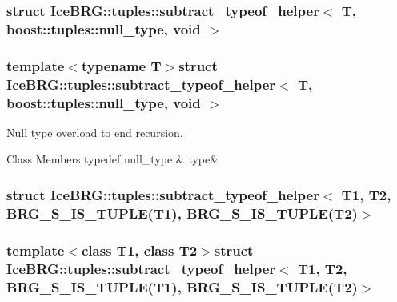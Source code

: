 \subsubsection{struct Ice\+B\+R\+G\+:\+:tuples\+:\+:subtract\+\_\+typeof\+\_\+helper$<$ T, boost\+:\+:tuples\+:\+:null\+\_\+type, void $>$}
\subsubsection*{template$<$typename T$>$struct Ice\+B\+R\+G\+::tuples\+::subtract\+\_\+typeof\+\_\+helper$<$ T, boost\+::tuples\+::null\+\_\+type, void $>$}

Null type overload to end recursion. \begin{DoxyFields}{Class Members}
\hypertarget{namespaceIceBRG_1_1tuples_a3ac5f6d7ed167ef5757b624c09149f96}{}typedef null\+\_\+type\label{namespaceIceBRG_1_1tuples_a3ac5f6d7ed167ef5757b624c09149f96}
&
type&
\\
\hline

\end{DoxyFields}
\label{structIceBRG_1_1tuples_1_1subtract__typeof__helper_3_01T1_00_01T2_00_01BRG__S__IS__TUPLE_07T1_08c8e4888bfd8d316092f0dc03c7128272}
\hypertarget{namespaceIceBRG_1_1tuples_structIceBRG_1_1tuples_1_1subtract__typeof__helper_3_01T1_00_01T2_00_01BRG__S__IS__TUPLE_07T1_08c8e4888bfd8d316092f0dc03c7128272}{}
\subsubsection{struct Ice\+B\+R\+G\+:\+:tuples\+:\+:subtract\+\_\+typeof\+\_\+helper$<$ T1, T2, B\+R\+G\+\_\+\+S\+\_\+\+I\+S\+\_\+\+T\+U\+P\+L\+E(T1), B\+R\+G\+\_\+\+S\+\_\+\+I\+S\+\_\+\+T\+U\+P\+L\+E(T2)$>$}
\subsubsection*{template$<$class T1, class T2$>$struct Ice\+B\+R\+G\+::tuples\+::subtract\+\_\+typeof\+\_\+helper$<$ T1, T2, B\+R\+G\+\_\+\+S\+\_\+\+I\+S\+\_\+\+T\+U\+P\+L\+E(\+T1), B\+R\+G\+\_\+\+S\+\_\+\+I\+S\+\_\+\+T\+U\+P\+L\+E(\+T2)$>$}

